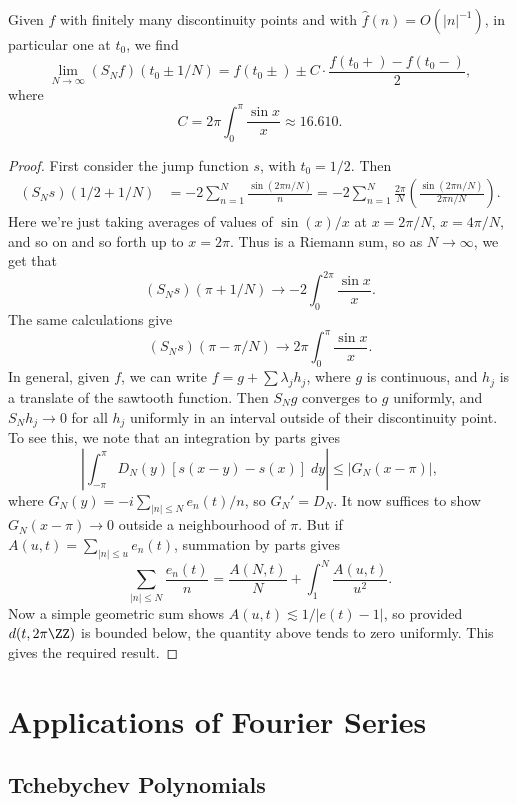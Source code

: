 \begin{theorem}
    Given $f$ with finitely many discontinuity points and with $\widehat{f}(n) = O(|n|^{-1})$, in particular one at $t_0$, we find
    \[ \lim_{N \to \infty} (S_N f)(t_0 \pm 1/N) = f(t_0 \pm ) \pm C \cdot \frac{f(t_0+) - f(t_0-)}{2}, \]
    where
    \[ C = 2 \pi \int_0^\pi \frac{\sin x}{x} \approx 16.610. \]
\end{theorem}
\begin{proof}
    First consider the jump function $s$, with $t_0 = 1/2$. Then
    \begin{align*}
        (S_N s)(1/2 + 1/N) &= -2 \sum_{n = 1}^N \frac{\sin(2 \pi n/N)}{n} = -2  \sum_{n = 1}^N \frac{2 \pi }{N} \left( \frac{\sin(2 \pi n/N)}{2 \pi n / N} \right).
    \end{align*}
    Here we're just taking averages of values of $\sin(x)/x$ at $x = 2\pi/N$, $x = 4\pi/N$, and so on and so forth up to $x = 2 \pi$. Thus is a Riemann sum, so as $N \to \infty$, we get that
    \[ (S_N s)(\pi + 1/N) \to - 2 \int_0^{2\pi} \frac{\sin x}{x}. \]
    The same calculations give
    \[ (S_N s)(\pi - \pi/N) \to 2 \pi \int_0^\pi \frac{\sin x}{x}. \]
    In general, given $f$, we can write $f = g + \sum \lambda_j h_j$, where $g$ is continuous, and $h_j$ is a translate of the sawtooth function. Then $S_N g$ converges to $g$ uniformly, and $S_N h_j \to 0$ for all $h_j$ uniformly in an interval outside of their discontinuity point. To see this, we note that an integration by parts gives
    \[ \left| \int_{-\pi}^\pi D_N(y)[s(x-y) - s(x)]\; dy \right| \leq |G_N(x - \pi)|, \]
    where $G_N(y) = -i \sum_{|n| \leq N} e_n(t)/n$, so $G_N' = D_N$. It now suffices to show $G_N(x - \pi) \to 0$ outside a neighbourhood of $\pi$. But if $A(u,t) = \sum_{|n| \leq u} e_n(t)$, summation by parts gives
    \[ \sum_{|n| \leq N} \frac{e_n(t)}{n} = \frac{A(N,t)}{N} + \int_1^N \frac{A(u,t)}{u^2}. \]
    Now a simple geometric sum shows $A(u,t) \lesssim 1/|e(t) - 1|$, so provided $d(t, 2 \pi \ZZ)$ is bounded below, the quantity above tends to zero uniformly. This gives the required result.
\end{proof}

\chapter{Applications of Fourier Series}

\section{Tchebychev Polynomials}

